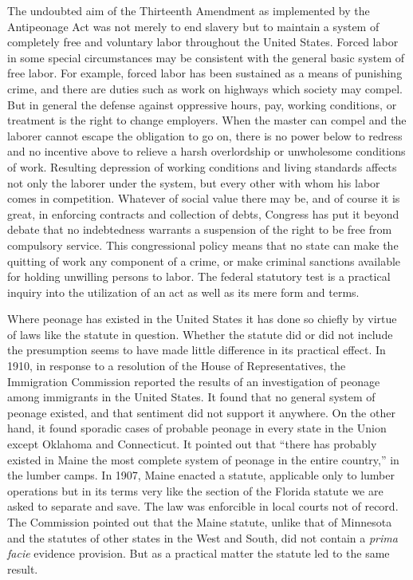 \documentclass[
  letterpaper,
  11pt,
  DIV=9,
  openright]{scrbook}
\begin{document}
The undoubted aim of the Thirteenth Amendment as implemented by the
Antipeonage Act was not merely to end slavery but to maintain a system
of completely free and voluntary labor throughout the United States.
Forced labor in some special circumstances may be consistent with the
general basic system of free labor. For example, forced labor has been
sustained as a means of punishing crime, and there are duties such as
work on highways which society may compel. But in general the defense
against oppressive hours, pay, working conditions, or treatment is the
right to change employers. When the master can compel and the laborer
cannot escape the obligation to go on, there is no power below to
redress and no incentive above to relieve a harsh overlordship or
unwholesome conditions of work. Resulting depression of working
conditions and living standards affects not only the laborer under the
system, but every other with whom his labor comes in competition.
Whatever of social value there may be, and of course it is great, in
enforcing contracts and collection of debts, Congress has put it beyond
debate that no indebtedness warrants a suspension of the right to be
free from compulsory service. This congressional policy means that no
state can make the quitting of work any component of a crime, or make
criminal sanctions available for holding unwilling persons to labor. The
federal statutory test is a practical inquiry into the utilization of an
act as well as its mere form and terms.

Where peonage has existed in the United States it has done so chiefly by
virtue of laws like the statute in question. Whether the statute did or
did not include the presumption seems to have made little difference in
its practical effect. In 1910, in response to a resolution of the House
of Representatives, the Immigration Commission reported the results of
an investigation of peonage among immigrants in the United States. It
found that no general system of peonage existed, and that sentiment did
not support it anywhere. On the other hand, it found sporadic cases of
probable peonage in every state in the Union except Oklahoma and
Connecticut. It pointed out that ``there has probably existed in Maine
the most complete system of peonage in the entire country,'' in the
lumber camps. In 1907, Maine enacted a statute, applicable only to
lumber operations but in its terms very like the section of the Florida
statute we are asked to separate and save. The law was enforcible in
local courts not of record. The Commission pointed out that the Maine
statute, unlike that of Minnesota and the statutes of other states in
the West and South, did not contain a \emph{prima facie} evidence
provision. But as a practical matter the statute led to the same result.
\end{document}
